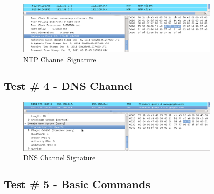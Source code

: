 \documentclass[titlepage]{article}
\begin{document}
\begin{figure}[htb]                                                                       
  \begin{center}
    \includegraphics[width=0.9\textwidth]{Pictures/NTP_SIG.png}
  \end{center}
  \caption{NTP Channel Signature}
  \label{fig:ntp_sig}
\end{figure}

\clearpage

\subsection{Test \# 4 - DNS Channel}

\begin{figure}[htb]                                                                       
  \begin{center}
    \includegraphics[width=0.9\textwidth]{Pictures/DNS_SIG.png}
  \end{center}
  \caption{DNS Channel Signature}
  \label{fig:dns_sig}
\end{figure}

\clearpage

\subsection{Test \# 5 - Basic Commands}
\end{document}
